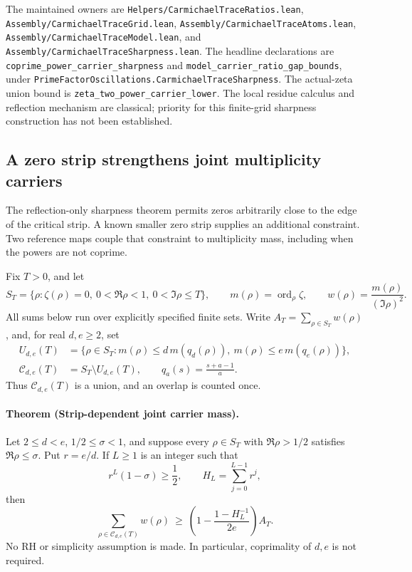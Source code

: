 The maintained owners are
\texttt{Helpers/CarmichaelTraceRatios.lean},
\texttt{Assembly/CarmichaelTraceGrid.lean},
\texttt{Assembly/CarmichaelTraceAtoms.lean},
\texttt{Assembly/CarmichaelTraceModel.lean}, and
\texttt{Assembly/CarmichaelTraceSharpness.lean}.
The headline declarations are
\texttt{coprime\_power\_carrier\_sharpness} and
\texttt{model\_carrier\_ratio\_gap\_bounds}, under
\texttt{PrimeFactorOscillations.CarmichaelTraceSharpness}.
The actual-zeta union bound is
\texttt{zeta\_two\_power\_carrier\_lower}.
The local residue calculus and reflection mechanism are classical;
priority for this finite-grid sharpness construction has not been established.

\subsection{A zero strip strengthens joint multiplicity carriers}
\label{sec:strip-joint-carriers}

The reflection-only sharpness theorem permits zeros arbitrarily close to
the edge of the critical strip. A known smaller zero strip supplies an
additional constraint. Two reference maps couple that constraint to
multiplicity mass, including when the powers are not coprime.

Fix \(T>0\), and let
\[
 S_T=\{\rho:\zeta(\rho)=0,\ 0<\Re\rho<1,\ 0<\Im\rho\le T\},
 \qquad m(\rho)=\operatorname{ord}_{\rho}\zeta,\qquad
 w(\rho)=\frac{m(\rho)}{(\Im\rho)^2}.
\]
All sums below run over explicitly specified finite sets. Write
\(A_T=\sum_{\rho\in S_T}w(\rho)\), and, for real \(d,e\ge2\), set
\[
 \begin{split}
 U_{d,e}(T)&=\{\rho\in S_T:
 m(\rho)\le d\,m(q_d(\rho)),\
 m(\rho)\le e\,m(q_e(\rho))\},\\
 \mathcal C_{d,e}(T)&=S_T\setminus U_{d,e}(T),\qquad
 q_a(s)=\frac{s+a-1}{a}.
 \end{split}
\]
Thus \(\mathcal C_{d,e}(T)\) is a union, and an overlap is counted once.

\paragraph{Theorem (Strip-dependent joint carrier mass).}
\label{thm:strip-joint-carrier}
Let \(2\le d<e\), \(1/2\le\sigma<1\), and suppose every
\(\rho\in S_T\) with \(\Re\rho>1/2\) satisfies \(\Re\rho\le\sigma\).
Put \(r=e/d\). If \(L\ge1\) is an integer such that
\[
 r^L(1-\sigma)\ge\frac12,\qquad H_L=\sum_{j=0}^{L-1}r^j,
\]
then
\[
 \sum_{\rho\in\mathcal C_{d,e}(T)}w(\rho)
 \ \ge\
 \left(1-\frac{1-H_L^{-1}}{2e}\right)A_T.
\]
No RH or simplicity assumption is made. In particular, coprimality of
\(d,e\) is not required.

